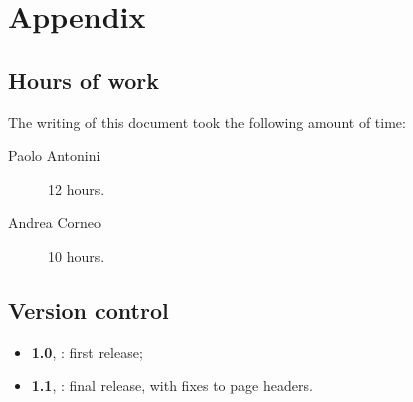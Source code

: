 \chapter{Appendix}\label{chap:appendix}

\section*{Hours of work}
The writing of this document took the following amount of time:

\begin{description}
	\item [Paolo Antonini] 12 hours.
	\item [Andrea Corneo] 10 hours.
\end{description}

\section*{Version control}
\begin{itemize}
	\item \textbf{1.0}, : first release;
	\item \textbf{1.1}, : final release, with fixes to page headers.
\end{itemize}
